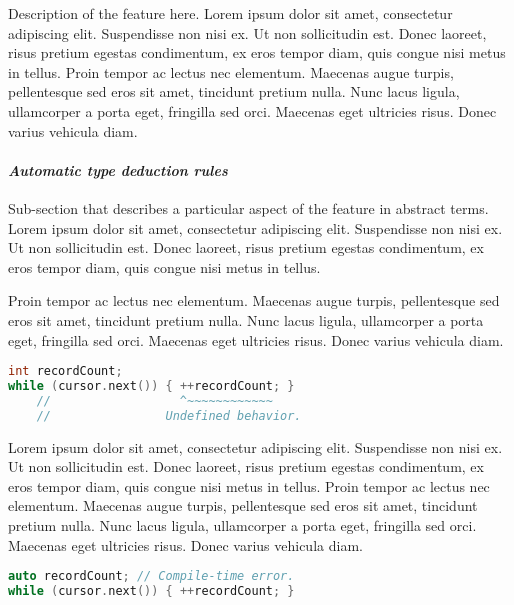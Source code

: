 \documentclass[twoside,10pt,letterpaper,usenames]{newstyle-PearsonGeneric-7-38}
\let\Begin\begin
\let\End\end
\begin{document}
Description of the feature here. Lorem ipsum dolor sit amet, consectetur
adipiscing elit. Suspendisse non nisi ex. Ut non sollicitudin est. Donec
laoreet, risus pretium egestas condimentum, ex eros tempor diam, quis
congue nisi metus in tellus. Proin tempor ac lectus nec elementum.
Maecenas augue turpis, pellentesque sed eros sit amet, tincidunt pretium
nulla. Nunc lacus ligula, ullamcorper a porta eget, fringilla sed orci.
Maecenas eget ultricies risus. Donec varius vehicula diam.

\hypertarget{automatic-type-deduction-rules}{%
\paragraph{\texorpdfstring{\emph{Automatic type deduction
rules}}{Automatic type deduction rules}}\label{automatic-type-deduction-rules}}

Sub-section that describes a particular aspect of the feature in
abstract terms. Lorem ipsum dolor sit amet, consectetur adipiscing elit.
Suspendisse non nisi ex. Ut non sollicitudin est. Donec laoreet, risus
pretium egestas condimentum, ex eros tempor diam, quis congue nisi metus
in tellus.

\Begin{leftbar}

Proin tempor ac lectus nec elementum. Maecenas augue turpis,
pellentesque sed eros sit amet, tincidunt pretium nulla. Nunc lacus
ligula, ullamcorper a porta eget, fringilla sed orci. Maecenas eget
ultricies risus. Donec varius vehicula diam.

\begin{lstlisting}[language=C++, caption={ example caption for recordcount }, label={ testlabel }, frame=tb]
int recordCount;
while (cursor.next()) { ++recordCount; }
    //                  ^~~~~~~~~~~~~
    //                Undefined behavior.
\end{lstlisting}
    

\End{leftbar}

Lorem ipsum dolor sit amet, consectetur adipiscing elit. Suspendisse non
nisi ex. Ut non sollicitudin est. Donec laoreet, risus pretium egestas
condimentum, ex eros tempor diam, quis congue nisi metus in tellus.
Proin tempor ac lectus nec elementum. Maecenas augue turpis,
pellentesque sed eros sit amet, tincidunt pretium nulla. Nunc lacus
ligula, ullamcorper a porta eget, fringilla sed orci. Maecenas eget
ultricies risus. Donec varius vehicula diam.

\begin{lstlisting}[language=C++, caption={ missing caption }, label={ testlabel }, frame=tb]
auto recordCount; // Compile-time error.
while (cursor.next()) { ++recordCount; }
\end{lstlisting}
    
\end{document}
